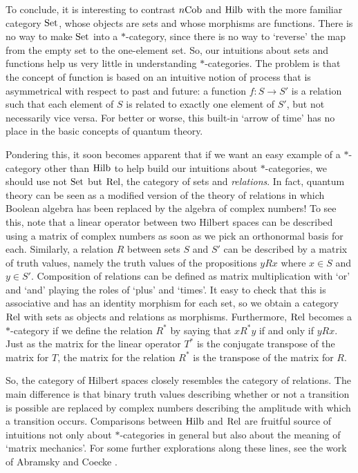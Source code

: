 \documentclass[12pt]{article}
\newcommand{\Set}{{\rm Set}}
\newcommand{\Rel}{{\rm Rel}}
\newcommand{\Hilb}{{\rm Hilb}}
\newcommand{\Cob}{{\rm Cob}}
\renewcommand{\to}{\rightarrow}
\newcommand{\maps}{\colon}
\begin{document}
To conclude, it is interesting to contrast $n\Cob$ and $\Hilb$ with
the more familiar category $\Set$, whose objects are sets and whose
morphisms are functions.  There is no way to make $\Set$ into a
$\ast$-category, since there is no way to `reverse' the map from the
empty set to the one-element set.  So, our intuitions about sets and
functions help us very little in understanding $\ast$-categories.  The
problem is that the concept of function is based on an intuitive
notion of process that is asymmetrical with respect to past and
future: a function $f \maps S \to S'$ is a relation such that each
element of $S$ is related to exactly one element of $S'$, but not
necessarily vice versa.  For better or worse, this built-in `arrow of
time' has no place in the basic concepts of quantum theory.

Pondering this, it soon becomes apparent that if we want an easy 
example of a $\ast$-category other than $\Hilb$ to help build our 
intuitions about $\ast$-categories, we should use not $\Set$ but 
$\Rel$, the category of sets and {\it relations}.  In fact, quantum 
theory can be seen as a modified version of the theory of relations in 
which Boolean algebra has been replaced by the algebra of complex 
numbers!  To see this, note that a linear operator between two Hilbert 
spaces can be described using a matrix of complex numbers as soon as we 
pick an orthonormal basis for each.  Similarly, a relation $R$ between 
sets $S$ and $S'$ can be described by a matrix of truth values, 
namely the truth values of the propositions $yRx$ where $x \in S$
and $y \in S'$.  Composition of relations can be defined as matrix 
multiplication with `or' and `and' playing the roles of `plus' and 
`times'.  It easy to check that this is associative and has an
identity morphism for each set, so we obtain a category $\Rel$ with 
sets as objects and relations as morphisms.  Furthermore, $\Rel$ 
becomes a $\ast$-category if we define the relation $R^\ast$ by saying 
that $xR^\ast y$ if and only if $yRx$.  Just as the matrix for the linear 
operator $T^\ast$ is the conjugate transpose of the matrix for $T$, the 
matrix for the relation $R^\ast$ is the transpose of the matrix for $R$.  

So, the category of Hilbert spaces closely resembles the category of
relations.  The main difference is that binary truth values describing
whether or not a transition is possible are replaced by complex
numbers describing the amplitude with which a transition occurs.
Comparisons between $\Hilb$ and $\Rel$ are fruitful source of
intuitions not only about $\ast$-categories in general but also about
the meaning of `matrix mechanics'.  For some further explorations
along these lines, see the work of Abramsky and Coecke \cite{AC}.
\end{document}
